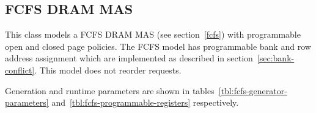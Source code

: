 \clearpage
\subsection{FCFS DRAM MAS} This class models a FCFS DRAM MAS (see
section~\ref{fcfs}) with programmable open and closed page policies. The FCFS
model has programmable bank and row address assignment which are implemented as
described in section~\ref{sec:bank-conflict}. This model does not reorder
requests.

\noindent Generation and runtime parameters are shown in
tables~\ref{tbl:fcfs-generator-parameters}
and~\ref{tbl:fcfs-programmable-registers}
respectively.

\begin{table}[htb]
\begin{center}
\end{center}
\caption{Additional generation parameters of the FCFS DRAM MAS model.}
\label{tbl:fcfs-generator-parameters}
\end{table}%

